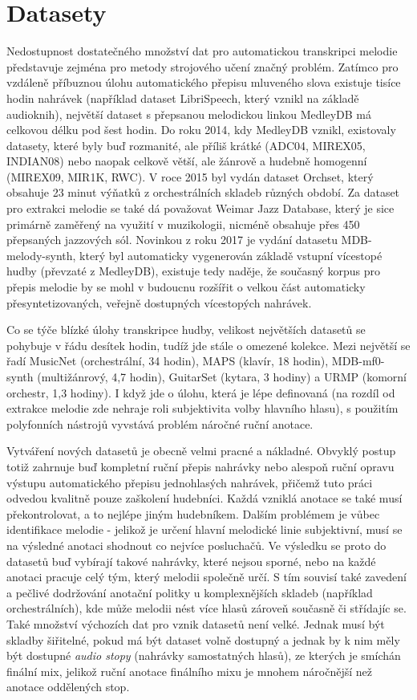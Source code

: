 \chapter{Datasety}

Nedostupnost dostatečného množství dat pro automatickou transkripci melodie představuje zejména pro metody strojového učení značný problém. Zatímco pro vzdáleně příbuznou úlohu automatického přepisu mluveného slova existuje tisíce hodin nahrávek (například dataset LibriSpeech, který vznikl na základě audioknih), největší dataset s přepsanou melodickou linkou MedleyDB má celkovou délku pod šest hodin. Do roku 2014, kdy MedleyDB vznikl, existovaly datasety, které byly buď rozmanité, ale příliš krátké (ADC04, MIREX05, INDIAN08) nebo naopak celkově větší, ale žánrově a hudebně homogenní (MIREX09, MIR1K, RWC). V roce 2015 byl vydán dataset Orchset, který obsahuje 23 minut výňatků z orchestrálních skladeb různých období. Za dataset pro extrakci melodie se také dá považovat Weimar Jazz Database, který je sice primárně zaměřený na využití v muzikologii, nicméně obsahuje přes 450 přepsaných jazzových sól. Novinkou z roku 2017 je vydání datasetu MDB-melody-synth, který byl automaticky vygenerován základě vstupní vícestopé hudby (převzaté z MedleyDB), existuje tedy naděje, že současný korpus pro přepis melodie by se mohl v budoucnu rozšířit o velkou část automaticky přesyntetizovaných, veřejně dostupných vícestopých nahrávek.

Co se týče blízké úlohy transkripce hudby, velikost největších datasetů se pohybuje v řádu desítek hodin, tudíž jde stále o omezené kolekce. Mezi největší se řadí MusicNet (orchestrální, 34 hodin), MAPS (klavír, 18 hodin), MDB-mf0-synth (multižánrový, 4,7 hodin), GuitarSet (kytara, 3 hodiny) a URMP (komorní orchestr, 1,3 hodiny). I když jde o úlohu, která je lépe definovaná (na rozdíl od extrakce melodie zde nehraje roli subjektivita volby hlavního hlasu), s použitím polyfonních nástrojů vyvstává problém náročné ruční anotace.

Vytváření nových datasetů je obecně velmi pracné a nákladné. Obvyklý postup totiž zahrnuje buď kompletní ruční přepis nahrávky nebo alespoň ruční opravu výstupu automatického přepisu jednohlasých nahrávek, přičemž tuto práci odvedou kvalitně pouze zaškolení hudebníci. Každá vzniklá anotace se také musí překontrolovat, a to nejlépe jiným hudebníkem. Dalším problémem je vůbec identifikace melodie - jelikož je určení hlavní melodické linie subjektivní, musí se na výsledné anotaci shodnout co nejvíce posluchačů. Ve výsledku se proto do datasetů buď vybírají takové nahrávky, které nejsou sporné, nebo na každé anotaci pracuje celý tým, který melodii společně určí. S tím souvisí také zavedení a pečlivé dodržování anotační politky u komplexnějších skladeb (například orchestrálních), kde může melodii nést více hlasů zároveň současně či střídajíc se. Také množství výchozích dat pro vznik datasetů není velké. Jednak musí být skladby šiřitelné, pokud má být dataset volně dostupný a jednak by k nim měly být dostupné \emph{audio stopy} (nahrávky samostatných hlasů), ze kterých je smíchán finální mix, jelikož ruční anotace finálního mixu je mnohem náročnější než anotace oddělených stop.

